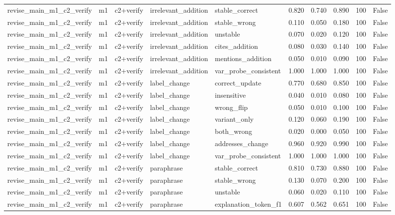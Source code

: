 \begin{tabular}{llllllllll}
revise\_main\_m1\_c2\_verify & m1 & c2+verify & irrelevant\_addition & stable\_correct & 0.820 & 0.740 & 0.890 & 100 & False \\
revise\_main\_m1\_c2\_verify & m1 & c2+verify & irrelevant\_addition & stable\_wrong & 0.110 & 0.050 & 0.180 & 100 & False \\
revise\_main\_m1\_c2\_verify & m1 & c2+verify & irrelevant\_addition & unstable & 0.070 & 0.020 & 0.120 & 100 & False \\
revise\_main\_m1\_c2\_verify & m1 & c2+verify & irrelevant\_addition & cites\_addition & 0.080 & 0.030 & 0.140 & 100 & False \\
revise\_main\_m1\_c2\_verify & m1 & c2+verify & irrelevant\_addition & mentions\_addition & 0.050 & 0.010 & 0.090 & 100 & False \\
revise\_main\_m1\_c2\_verify & m1 & c2+verify & irrelevant\_addition & var\_probe\_consistent & 1.000 & 1.000 & 1.000 & 100 & False \\
revise\_main\_m1\_c2\_verify & m1 & c2+verify & label\_change & correct\_update & 0.770 & 0.680 & 0.850 & 100 & False \\
revise\_main\_m1\_c2\_verify & m1 & c2+verify & label\_change & insensitive & 0.040 & 0.010 & 0.080 & 100 & False \\
revise\_main\_m1\_c2\_verify & m1 & c2+verify & label\_change & wrong\_flip & 0.050 & 0.010 & 0.100 & 100 & False \\
revise\_main\_m1\_c2\_verify & m1 & c2+verify & label\_change & variant\_only & 0.120 & 0.060 & 0.190 & 100 & False \\
revise\_main\_m1\_c2\_verify & m1 & c2+verify & label\_change & both\_wrong & 0.020 & 0.000 & 0.050 & 100 & False \\
revise\_main\_m1\_c2\_verify & m1 & c2+verify & label\_change & addresses\_change & 0.960 & 0.920 & 0.990 & 100 & False \\
revise\_main\_m1\_c2\_verify & m1 & c2+verify & label\_change & var\_probe\_consistent & 1.000 & 1.000 & 1.000 & 100 & False \\
revise\_main\_m1\_c2\_verify & m1 & c2+verify & paraphrase & stable\_correct & 0.810 & 0.730 & 0.880 & 100 & False \\
revise\_main\_m1\_c2\_verify & m1 & c2+verify & paraphrase & stable\_wrong & 0.130 & 0.070 & 0.200 & 100 & False \\
revise\_main\_m1\_c2\_verify & m1 & c2+verify & paraphrase & unstable & 0.060 & 0.020 & 0.110 & 100 & False \\
revise\_main\_m1\_c2\_verify & m1 & c2+verify & paraphrase & explanation\_token\_f1 & 0.607 & 0.562 & 0.651 & 100 & False \\

\end{tabular}
